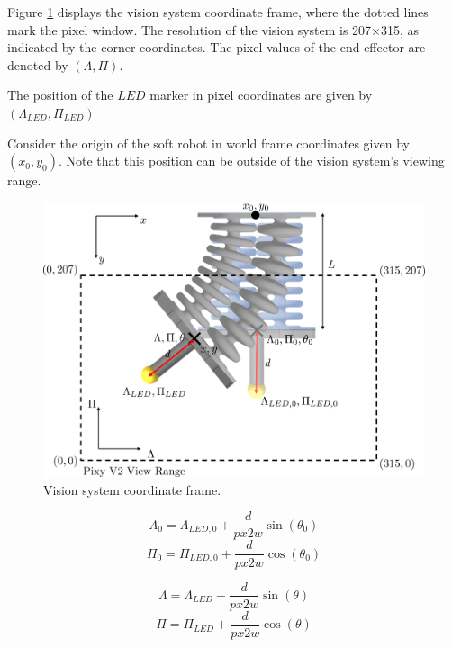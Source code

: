 \label{app:chap5}

Figure \ref{figapp5:px2w} displays the vision system coordinate frame, where the dotted lines mark the pixel window. The resolution of the vision system is 207$\times$315, as indicated by the corner coordinates. The pixel values of the end-effector are denoted by $(\Lambda,\Pi)$. 

The position of the $LED$ marker in pixel coordinates are given by $(\Lambda_{LED},\Pi_{LED})$


Consider the origin of the soft robot in world frame coordinates given by $(x_0,y_0)$. Note that this position can be outside of the vision system's viewing range. 

\begin{figure}[H]
    \centering
    \includegraphics[width = \textwidth]{Figures/Appendix5/pix2w.png}
    \caption{Vision system coordinate frame.}
    \label{figapp5:px2w}
\end{figure}



\begin{equation}
    \Lambda_0 = \Lambda_{LED,0} + \frac{d}{px2w} \sin(\theta_0)
\end{equation}
\begin{equation}
    \Pi_0 = \Pi_{LED,0} + \frac{d}{px2w} \cos(\theta_0)
\end{equation}


\begin{equation}
    \Lambda = \Lambda_{LED} + \frac{d}{px2w} \sin(\theta)
\end{equation}
\begin{equation}    
    \Pi = \Pi_{LED} + \frac{d}{px2w} \cos(\theta)
\end{equation}

